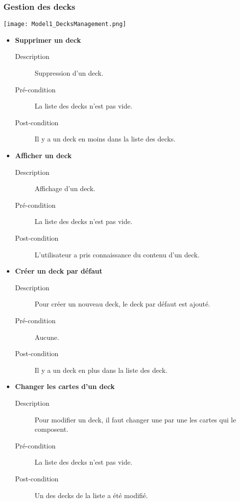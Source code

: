\documentclass[12pt]{article}
\begin{document}
		\subsubsection{Gestion des \glspl{deck}}
			\begin{center}\texttt{[image: Model1\_DecksManagement.png]}\end{center}
			\begin{itemize}
				\item \textbf{Supprimer un \gls{deck}}
				\begin{description}
					\item[Description] Suppression d'un \gls{deck}.
					\item[Pré-condition] La liste des \glspl{deck} n'est pas vide.
					\item[Post-condition] Il y a un \gls{deck} en moins dans la liste des \glspl{deck}.\\
				\end{description}

				\item \textbf{Afficher un \gls{deck}}
				\begin{description}
					\item[Description] Affichage d'un \gls{deck}.
					\item[Pré-condition] La liste des \glspl{deck} n'est pas vide.
					\item[Post-condition] L'utilisateur a pris connaissance du contenu d'un \gls{deck}.\\
				\end{description}

				\item \textbf{Créer un \gls{deck} par défaut}
				\begin{description}
					\item[Description] Pour créer un nouveau \gls{deck}, le \gls{deck} par défaut est ajouté.
					\item[Pré-condition] Aucune.
					\item[Post-condition] Il y a un \gls{deck} en plus dans la liste des \gls{deck}.\\
				\end{description}

				\item \textbf{Changer les cartes d'un \gls{deck}}
				\begin{description}
					\item[Description] Pour modifier un \gls{deck}, il faut changer une par une les cartes qui le composent.
					\item[Pré-condition] La liste des \glspl{deck} n'est pas vide.
					\item[Post-condition] Un des \glspl{deck} de la liste a été modifié.\\
				\end{description}
			\end{itemize}
\end{document}
